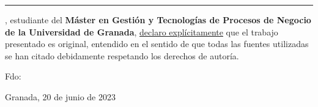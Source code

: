 \documentclass[
11pt, %
english, %
singlespacing, %
headsepline, %
]{MastersDoctoralThesis} %
\begin{document}
\pagestyle{empty}
\cleardoublepage

\par\noindent\rule{\textwidth}{2pt}

\vspace{2cm}

{\large

  \textbf{\authorname}, estudiante del \textbf{Máster en Gestión y Tecnologías de Procesos de Negocio de la Universidad de Granada}, \underline{declaro explícitamente} que el trabajo presentado es original, entendido en el sentido de que todas las fuentes utilizadas se han citado debidamente respetando los derechos de autoría.

}
\vfill

{
  \large

  Fdo: \textbf{\authorname}
}

\begin{flushright}
  \large Granada, 20 de junio de 2023
\end{flushright}



 
\end{document}
